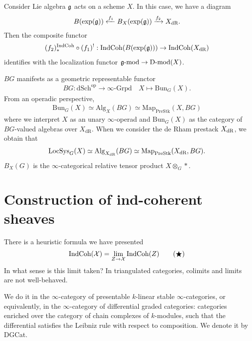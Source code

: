 {\begin{example}
    Consider Lie algebra $\mathfrak{g}$ acts on a scheme $X$. In this case, we have a diagram 
    \begin{align*}
        B(\exp(\mathfrak{g}))\xleftarrow{f_1} B_X(\exp(\mathfrak{g})) \xrightarrow{f_2} X_{\text{dR}}.
    \end{align*}
    Then the composite functor 
    \begin{align*}
        (f_2)^{\operatorname{IndCoh}}_*\circ (f_1)^!:\operatorname{IndCoh}(B(\exp(\mathfrak{g})))\to \operatorname{IndCoh}(X_{\text{dR}})
    \end{align*}
    identifies with the localization functor $\mathfrak{g}\text{-mod}\to \operatorname{D-mod}(X)$. 
\end{example}

\begin{remark}
    $BG$ manifests as a geometric representable functor 
    \begin{align*}
        BG: \mathrm{dSch}^{\mathrm{op}} \to \infty\text{-}\mathrm{Grpd} \quad X\mapsto \text{Bun}_G(X).
    \end{align*}
    From an operadic perspective, 
    \begin{align*}
        \text{Bun}_G(X) \simeq \text{Alg}_{X}(BG) \simeq  \mathrm{Map}_{\mathrm{PreStk}}(X, BG)
    \end{align*}
    where we interpret $X$ as an unary $\infty$-operad and $\text{Bun}_G(X)$ as the category of $BG$-valued algebras over $X_{\mathrm{dR}}$.
    When we consider the de Rham prestack $X_{\text{dR}}$, we obtain that
    \begin{align*}
         \text{LocSys}_G(X) \simeq \text{Alg}_{X_{\text{dR}}}(BG) \simeq  \mathrm{Map}_{\mathrm{PreStk}}(X_{\text{dR}}, BG).
    \end{align*}
    $B_X(G)$  is the $\infty$-categorical relative tensor product $X\otimes_{G} *$.
\end{remark}
\section{Construction of ind-coherent sheaves}
There is a heuristic formula we have presented 
\begin{align*}
    \operatorname{IndCoh}(\mathcal{X}) = \lim_{Z\to\mathcal{X}}\operatorname{IndCoh}(Z) \tag{$\bigstar$}
\end{align*}
In what sense is this limit taken? In triangulated categories, colimits and limits are not well-behaved. 

We do it in the $\infty$-category of presentable $k$-linear stable $\infty$-categories, or equivalently, in the $\infty$-category of differential graded categories:
categories enriched over the category of chain complexes of $k$-modules, such that the differential satisfies the Leibniz rule with respect to composition.
We denote it by DGCat.

}
